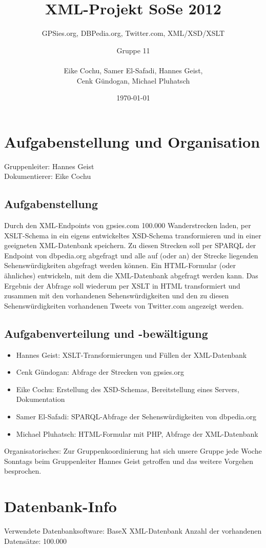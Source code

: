 \documentclass[10pt,a4paper]{scrartcl}
\title{XML-Projekt SoSe 2012}
\subtitle{GPSies.org, DBPedia.org, Twitter.com, XML/XSD/XSLT\vspace*{.7cm}}
\author{Gruppe 11\\\hfill\\Eike Cochu, Samer El-Safadi, Hannes Geist,\\Cenk Gündogan, Michael Pluhatsch}
\date{\today}
\begin{document}
\maketitle
\thispagestyle{empty}
\vspace*{2cm}
\tableofcontents
\newpage
\renewcommand{\baselinestretch}{1.5}
\selectfont

\section{Aufgabenstellung und Organisation}
Gruppenleiter: Hannes Geist\\
Dokumentierer: Eike Cochu

\subsection{Aufgabenstellung}
Durch den XML-Endpoints von gpsies.com 100.000 Wanderstrecken laden, per XSLT-Schema in ein eigens entwickeltes XSD-Schema transformieren und in einer geeigneten XML-Datenbank speichern. Zu diesen Strecken soll per SPARQL der Endpoint von dbpedia.org abgefragt und alle auf (oder an) der Strecke liegenden Sehenswürdigkeiten abgefragt werden können. Ein HTML-Formular (oder ähnliches) entwickeln, mit dem die XML-Datenbank abgefragt werden kann. Das Ergebnis der Abfrage soll wiederum per XSLT in HTML transformiert und zusammen mit den vorhandenen Sehenswürdigkeiten und den zu diesen Sehenswürdigkeiten vorhandenen Tweets von Twitter.com angezeigt werden.

\subsection{Aufgabenverteilung und -bewältigung}
\begin{itemize}
\item Hannes Geist: XSLT-Transformierungen und Füllen der XML-Datenbank
\item Cenk Gündogan: Abfrage der Strecken von gpsies.org 
\item Eike Cochu: Erstellung des XSD-Schemas, Bereitstellung eines Servers, Dokumentation
\item Samer El-Safadi: SPARQL-Abfrage der Sehenswürdigkeiten von dbpedia.org
\item Michael Pluhatsch: HTML-Formular mit PHP, Abfrage der XML-Datenbank
\end{itemize}







Organisatorisches: Zur Gruppenkoordinierung hat sich unsere Gruppe jede Woche Sonntags beim Gruppenleiter Hannes Geist getroffen und das weitere Vorgehen besprochen.

\section{Datenbank-Info}
Verwendete Datenbanksoftware: BaseX XML-Datenbank
Anzahl der vorhandenen Datensätze: 100.000
\end{document}
